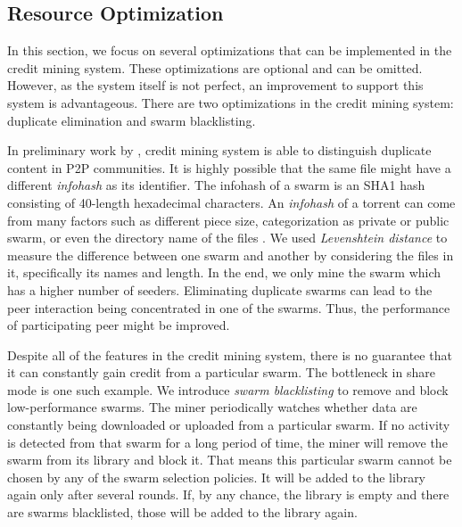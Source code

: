 \subsection{Resource Optimization}
\label{section:optimization}
In this section, we focus on several optimizations that can be implemented in the credit mining system. These optimizations are optional and can be omitted. However, as the system itself is not perfect, an improvement to support this system is advantageous. There are two optimizations in the credit mining system: duplicate elimination and swarm blacklisting.%

In preliminary work by \citeauthor{2015:creditmining:capota}, credit mining system is able to distinguish duplicate content in P2P communities. It is highly possible that the same file might have a different \textit{infohash} as its identifier. The infohash of a swarm is an SHA1 hash consisting of 40-length hexadecimal characters. An \textit{infohash} of a torrent can come from many factors such as different piece size, categorization as private or public swarm, or even the directory name of the files \cite{2015:creditmining:capota}. We used \textit{Levenshtein distance} to measure the difference between one swarm and another by considering the files in it, specifically its names and length. In the end, we only mine the swarm which has a higher number of seeders. Eliminating duplicate swarms can lead to the peer interaction being concentrated in one of the swarms. Thus, the performance of participating peer might be improved.

Despite all of the features in the credit mining system, there is no guarantee that it can constantly gain credit from a particular swarm. The bottleneck in share mode is one such example. We introduce \textit{swarm blacklisting} to remove and block low-performance swarms. The miner periodically watches whether data are constantly being downloaded or uploaded from a particular swarm. If no activity is detected from that swarm for a long period of time, the miner will remove the swarm from its library and block it. That means this particular swarm cannot be chosen by any of the swarm selection policies. It will be added to the library again only after several rounds. If, by any chance, the library is empty and there are swarms blacklisted, those will be added to the library again.

